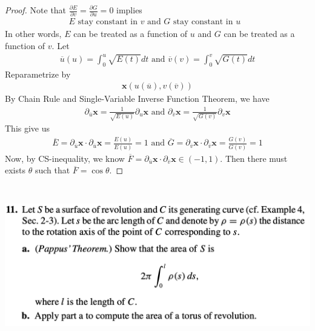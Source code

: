 \documentclass{report}
\begin{document}
\begin{proof}
Note that $\frac{\partial  E}{\partial v}=\frac{\partial G}{\partial u}=0$ implies 
\begin{align*}
E\text{ stay constant in $v$ and  $G$ stay constant in  $u$ }
\end{align*}
In other words, $E$ can be treated as a function of  $u$ and $G$ can be treated as a function of $v$. Let
\begin{align*}
\overline{u}(u)=\int_0^u  \sqrt{E(t)}dt \text{ and }\overline{v}(v)=\int_0^v \sqrt{G(t)}dt 
\end{align*}
Reparametrize by 
\begin{align*}
\textbf{x}(u(\overline{u}),v(\overline{v}))
\end{align*}
By Chain Rule and Single-Variable Inverse Function Theorem, we have 
\begin{align*}
\partial_{\overline{u}} \textbf{x}=\frac{1}{\sqrt{E(u)} }\partial_u \textbf{x} \text{ and }\partial_{\overline{v}}\textbf{x}=\frac{1}{\sqrt{G(v)} }\partial_v \textbf{x}
\end{align*}
This give us 
\begin{align*}
  \overline{E}= \partial_{\overline{u}}\textbf{x}\cdot \partial_{\overline{u}}\textbf{x}= \frac{E(u)}{E(u)}=1\text{ and }\overline{G}=\partial_{\overline{v}}\textbf{x}\cdot \partial_{\overline{v}}\textbf{x}=\frac{G(v)}{G(v)}=1
\end{align*}
Now, by CS-inequality, we know $\overline{F}=\partial_{\overline{u}}\textbf{x}\cdot \partial_{\overline{v}}\textbf{x}\in (-1,1)$. Then there must exists $\theta$ such that $\overline{F}=\cos \theta$. 
\end{proof}
\begin{question}{}{}
\includegraphics[height=7cm,width=18cm]{hw4q12}
\end{question}
\end{document}
